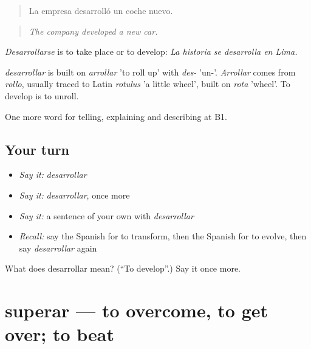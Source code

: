 \begin{quote}
La empresa desarrolló un coche nuevo.
\end{quote}

\begin{quote}
\emph{The company developed a new car.}
\end{quote}

\emph{Desarrollarse} is to take place or to develop: \emph{La historia se desarrolla en Lima.}

\begin{cousinweb}
\emph{desarrollar} is built on \emph{arrollar} 'to roll up' with \emph{des-} 'un-'. \emph{Arrollar} comes from \emph{rollo}, usually traced to Latin \emph{rotulus} 'a little wheel', built on \emph{rota} 'wheel'. To develop is to unroll.
\end{cousinweb}

\begin{grammarlens}[title={What you've built}]
One more word for telling, explaining and describing at B1.
\end{grammarlens}

\subsection*{Your turn}
\begin{itemize}
\raggedright
  \item \emph{Say it:} \emph{desarrollar}
  \item \emph{Say it:} \emph{desarrollar}, once more
  \item \emph{Say it:} a sentence of your own with \emph{desarrollar}
  \item \emph{Recall:} say the Spanish for to transform, then the Spanish for to evolve, then say \emph{desarrollar} again
\end{itemize}

\begin{tcolorbox}[breakable,colback=teal!4,colframe=teal!35!black,title={Before you move on}]
What does desarrollar mean? (\textquotedblleft{}To develop\textquotedblright{}.) Say it once more.
\end{tcolorbox}
\section[superar]{superar — to overcome, to get over; to beat}

\label{lesson:ES-C572-superar}



